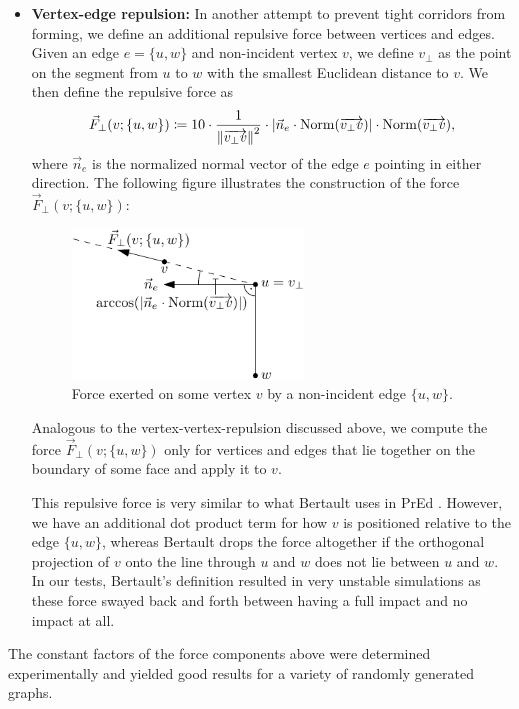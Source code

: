 \begin{itemize}
\item \textbf{Vertex-edge repulsion:} %
In another attempt to prevent tight corridors from forming, we define an additional repulsive force between vertices and edges.
Given an edge $e = \{u,w\}$ and non-incident vertex $v$, we define $v_\perp$ as the point on the segment from $u$ to $w$ with the smallest Euclidean distance to $v$.
We then define the repulsive force as
%
\begin{equation}
	\vec{F}_\bot(v;\{u,w\}) \coloneqq
	10 \cdot \frac{1}{\left\lVert\overrightarrow{v_\perp{}v}\right\rVert^2}
	\cdot \left\lvert\vec{n}_e \cdot \operatorname{Norm}(\overrightarrow{v_\perp{}v})\right\rvert
	\cdot \operatorname{Norm}(\overrightarrow{v_\perp{}v})
	,
\end{equation}
%
where $\vec{n}_e$ is the normalized normal vector of the edge $e$ pointing in either direction.
The following figure illustrates the construction of the force $\vec{F}_\bot(v;\{u,w\})$:
%
\begin{figure}[H]
	\centering
	\includegraphics[height=40mm]{Resources/Drawing-Forces-VertexEdgeRepulsion.pdf}
	\caption{Force exerted on some vertex $v$ by a non-incident edge $\{u,w\}$.}
	\label{fig:drawing-forces-vertex-edge-repulsion}
\end{figure}

Analogous to the vertex-vertex-repulsion discussed above, we compute the force $\vec{F}_\bot(v;\{u,w\})$ only for vertices and edges that lie together on the boundary of some face and apply it to $v$.

This repulsive force is very similar to what Bertault uses in PrEd \cite{bertault1999force}.
However, we have an additional dot product term for how $v$ is positioned relative to the edge $\{u,w\}$, whereas Bertault drops the force altogether if the orthogonal projection of $v$ onto the line through $u$ and $w$ does not lie between $u$ and $w$.
In our tests, Bertault's definition resulted in very unstable simulations as these force swayed back and forth between having a full impact and no impact at all.
\end{itemize}

The constant factors of the force components above were determined experimentally and yielded good results for a variety of randomly generated graphs.

